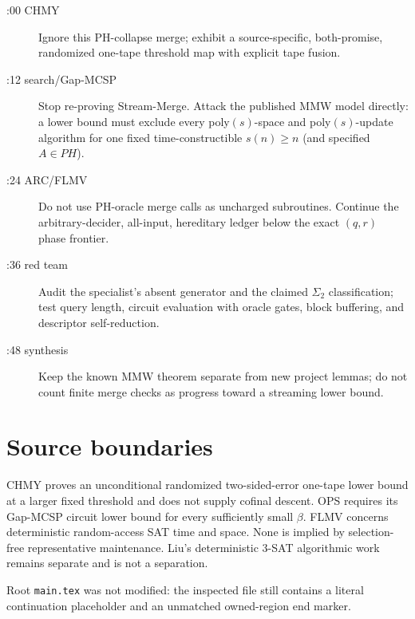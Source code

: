 \documentclass[11pt]{article}
\begin{document}
\begin{description}
\item[:00 CHMY] Ignore this PH-collapse merge; exhibit a source-specific, both-promise, randomized one-tape threshold map with explicit tape fusion.
\item[:12 search/Gap-MCSP] Stop re-proving Stream-Merge.  Attack the published MMW model directly: a lower bound must exclude every poly$(s)$-space and poly$(s)$-update algorithm for one fixed time-constructible $s(n)\ge n$ (and specified $A\in PH$).
\item[:24 ARC/FLMV] Do not use PH-oracle merge calls as uncharged subroutines.  Continue the arbitrary-decider, all-input, hereditary ledger below the exact $(q,r)$ phase frontier.
\item[:36 red team] Audit the specialist's absent generator and the claimed $\Sigma_2$ classification; test query length, circuit evaluation with oracle gates, block buffering, and descriptor self-reduction.
\item[:48 synthesis] Keep the known MMW theorem separate from new project lemmas; do not count finite merge checks as progress toward a streaming lower bound.
\end{description}

\section*{Source boundaries}
CHMY proves an unconditional randomized two-sided-error one-tape lower bound at a larger fixed threshold and does not supply cofinal descent.  OPS requires its Gap-MCSP circuit lower bound for every sufficiently small $\beta$.  FLMV concerns deterministic random-access SAT time and space.  None is implied by selection-free representative maintenance.  Liu's deterministic 3-SAT algorithmic work remains separate and is not a separation.

Root \texttt{main.tex} was not modified: the inspected file still contains a literal continuation placeholder and an unmatched owned-region end marker.
\end{document}

